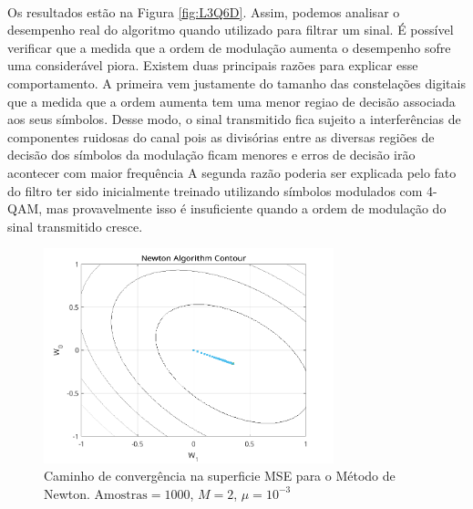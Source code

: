 \documentclass[a4paper,10pt]{article}
\begin{document}
\begin{enumerate}
\begin{enumerate}
						\paragraph{}Os resultados estão na Figura \ref{fig:L3Q6D}. Assim, podemos analisar o desempenho real do algoritmo quando utilizado para filtrar um sinal. É possível verificar que a medida
						que a ordem de modulação aumenta o desempenho sofre uma considerável piora. Existem duas principais razões para explicar esse comportamento. A primeira vem justamente do tamanho das constelações 
						digitais que a medida que a ordem aumenta tem uma menor regiao de decisão associada aos seus símbolos. Desse modo, o sinal transmitido fica sujeito a interferências de componentes ruidosas do canal pois
						as divisórias entre as diversas regiões de decisão dos símbolos da modulação ficam menores e erros de decisão irão acontecer com maior frequência A segunda razão poderia ser explicada pelo fato do filtro
						ter sido inicialmente treinado utilizando símbolos modulados com 4-QAM, mas provavelmente isso é insuficiente quando a ordem de modulação do sinal transmitido cresce.

				\end{enumerate}
				
				\newpage
				\begin{figure}[H]
					\centering
					\includegraphics[width=0.75\textwidth]{figs/newton_contour.png}
					\caption{Caminho de convergência na superficie MSE para o Método de Newton. $\text{Amostras} = 1000$, $M = 2$, $\mu = 10^{-3}$}
					\label{fig:newton_contour}
				\end{figure}
				

\end{enumerate}
\end{document}
